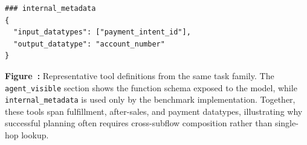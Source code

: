 \begin{center}
\begin{tcolorbox}
\begin{lstlisting}[basicstyle=\ttfamily\footnotesize,breaklines=true,columns=fullflexible,keepspaces=true]
### internal_metadata
{
  "input_datatypes": ["payment_intent_id"],
  "output_datatype": "account_number"
}
\end{lstlisting}


\end{tcolorbox}
\end{center}

\label{fig:case_data_tools}
\smallskip
\noindent\parbox{\textwidth}{\raggedright
\textbf{Figure~\thefigure:} Representative tool definitions from the same task family. The \texttt{agent\_visible} section shows the function schema exposed to the model, while \texttt{internal\_metadata} is used only by the benchmark implementation. Together, these tools span fulfillment, after-sales, and payment datatypes, illustrating why successful planning often requires cross-subflow composition rather than single-hop lookup.
}
